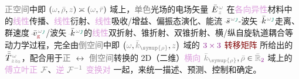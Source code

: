 \textcolor{gray}{正空间}中即 $\left( \mathcolor{gray}{\omega}, \mathcolor{gray}{\bar{\rho}}, \mathcolor{gray}{z} \right) \asymp \left( \mathcolor{gray}{\omega}, \mathcolor{gray}{\bar{r}} \right)$ 域上，\textcolor{gray}{单色}光场的电场矢量 $\bar{E}^{\;\!\mathcolor{gray}{\omega}}_{\;\!\mathcolor{gray}{z}}$ 在\textcolor{Plum}{各向异性}材料中的\textcolor{Plum}{线性}\textcolor{NavyBlue}{传播}、\textcolor{Plum}{线性}\textcolor{NavyBlue}{衍射}、\textcolor{Plum}{线性}\textcolor{NavyBlue}{吸收}/\textcolor{NavyBlue}{增益}、偏振态演化、\textcolor{PineGreen}{能流}$\Xint{\begin{smallmatrix} ~ \\ {}^{}_{\mathcolor{gray}{-}} \\ ~ \end{smallmatrix}}{20}{\bar{s}}^{\;\! \mathcolor{gray}{\omega} \textcolor{PineGreen}{\jmath}}$-\textcolor{PineGreen}{波矢}$\Xint{\begin{smallmatrix} ~ \\ {}^{}_{\mathcolor{gray}{-}} \\ ~ \end{smallmatrix}}{15}{\bar{k}}^{\;\! \mathcolor{gray}{\omega} \textcolor{PineGreen}{\jmath}}$走离、\textcolor{PineGreen}{群速度}$\Xint{\begin{smallmatrix} ~ \\ {}^{}_{\mathcolor{gray}{-}} \\ ~ \end{smallmatrix}}{20}{\bar{v}}^{\;\! \mathcolor{gray}{\omega} \textcolor{PineGreen}{\jmath}}_{\textcolor{Maroon}{\text{g}}}$/\textcolor{PineGreen}{波矢}$\Xint{\begin{smallmatrix} ~ \\ {}^{}_{\mathcolor{gray}{-}} \\ ~ \end{smallmatrix}}{15}{\bar{k}}^{\;\! \mathcolor{gray}{\omega} \textcolor{PineGreen}{\jmath}}$的\textcolor{Plum}{线性}\textcolor{PineGreen}{双折射}、\textcolor{PineGreen}{锥折射}、\textcolor{PineGreen}{双锥折射}、横/纵\textcolor{NavyBlue}{自旋轨道耦合}等动力学过程，完全由\textcolor{gray}{倒空间}中即 $\left( \mathcolor{gray}{\omega}, \mathcolor{gray}{\bar{k}_{\symup{\rho}}}, \mathcolor{gray}{z} \right)$ 域的 $\textcolor{Plum}{3 \times 3}$ \textcolor{Maroon}{转移矩阵}  所给出的 $\Xint{\mathcolor{gray}{-}}{30}{\bar{\bar{T}}}^{\;\!\mathcolor{gray}{\omega}}_{\;\! \mathcolor{gray}{z} \mathcolor{gray}{z_0}}$，配合用于\textcolor{gray}{正} $\longleftrightarrow$ \textcolor{gray}{倒空间}转换的 2D（二维）\textcolor{Plum}{横向} $\mathcolor{gray}{\bar{k}_{\symup{\rho}}}, \mathcolor{gray}{\bar{\rho}} \in \mathcolor{gray}{\bar{\mathbb{R}}_{\textcolor{Plum}{2}}}$ 域上的 \textcolor{Plum}{傅立叶正} $\mathcolor{gray}{\mathcal F}$、\textcolor{Plum}{逆} $\mathcolor{gray}{\mathcal F^{-1}}$ \textcolor{Plum}{变换对}  一起，来统一描述、预测、控制和确定。

